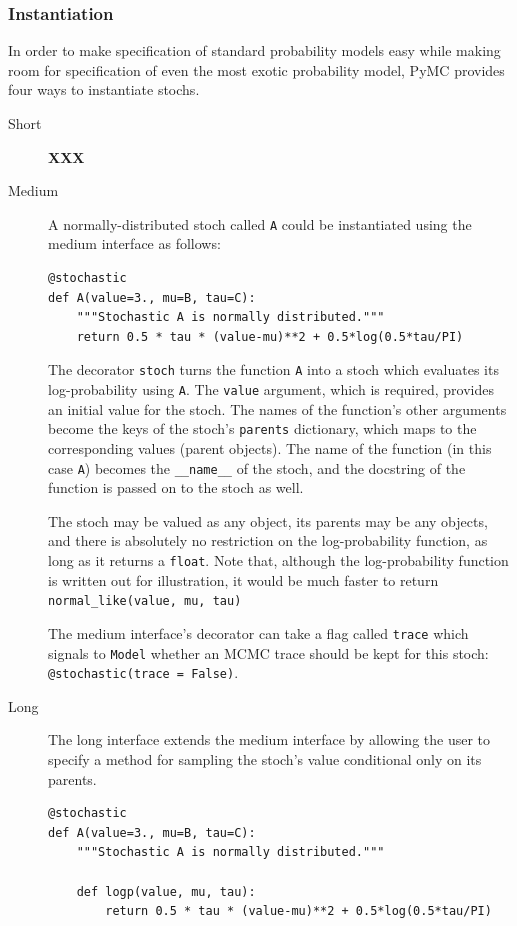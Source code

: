 \documentclass[]{book}
\begin{document}
\subsubsection{Instantiation}
In order to make specification of standard probability models easy while making room for specification of even the most exotic probability model, PyMC provides four ways to instantiate stochs.
\begin{description}
    \item[Short] \textbf{XXX}
    \item[Medium] A normally-distributed stoch called \texttt{A} could be instantiated using the medium interface as follows:
    \begin{verbatim}
@stochastic
def A(value=3., mu=B, tau=C):
    """Stochastic A is normally distributed."""
    return 0.5 * tau * (value-mu)**2 + 0.5*log(0.5*tau/PI)
    \end{verbatim}
    The decorator \texttt{stoch} turns the function \texttt{A} into a stoch which evaluates its log-probability using \texttt{A}. The \texttt{value} argument, which is required, provides an initial value for the stoch. The names of the function's other arguments become the keys of the stoch's \texttt{parents} dictionary, which maps to the corresponding values (parent objects). The name of the function (in this case \texttt{A}) becomes the \texttt{\_\_name\_\_} of the stoch, and the docstring of the function is passed on to the stoch as well.

    The stoch may be valued as any object, its parents may be any objects, and there is absolutely no restriction on the log-probability function, as long as it returns a \texttt{float}. Note that, although the log-probability function is written out for illustration, it would be much faster to return \texttt{normal\_like(value, mu, tau)}

    The medium interface's decorator can take a flag called \texttt{trace} which signals to \texttt{Model} whether an MCMC trace should be kept for this stoch: \texttt{@stochastic(trace = False)}.
    \item[Long] The long interface extends the medium interface by allowing the user to specify a method for sampling the stoch's value conditional only on its parents.
    \begin{verbatim}
@stochastic
def A(value=3., mu=B, tau=C):
    """Stochastic A is normally distributed."""

    def logp(value, mu, tau):
        return 0.5 * tau * (value-mu)**2 + 0.5*log(0.5*tau/PI)


\end{verbatim}
\end{description}
\end{document}
